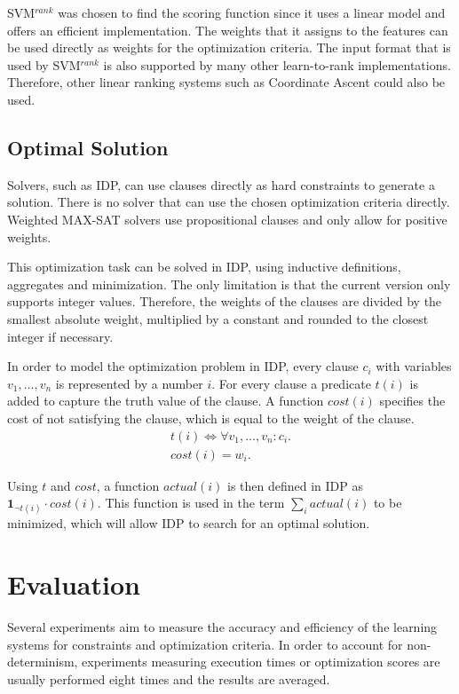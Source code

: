 \documentclass[letterpaper]{article}
\newcommand{\svm}{SVM$^{rank}$}
\theoremstyle{definition}
\begin{document}
\svm{} \cite{joachims2006training} was chosen to find the scoring function since it uses a linear model and offers an efficient implementation.
The weights that it assigns to the features can be used directly as weights for the optimization criteria.
The input format that is used by \svm{} is also supported by many other learn-to-rank implementations.
Therefore, other linear ranking systems such as Coordinate Ascent \cite{metzler2007linear} could also be used.

\subsection{Optimal Solution}
Solvers, such as IDP, can use clauses directly as hard constraints to generate a solution.
There is no solver that can use the chosen optimization criteria directly.
Weighted MAX-SAT solvers use propositional clauses and only allow for positive weights.

This optimization task can be solved in IDP, using inductive definitions, aggregates and minimization.
The only limitation is that the current version only supports integer values.
Therefore, the weights of the clauses are divided by the smallest absolute weight, multiplied by a constant and rounded to the closest integer if necessary.

In order to model the optimization problem in IDP, every clause $c_i$ with variables $v_1, ..., v_n$ is represented by a number $i$. For every clause a predicate $t(i)$ is added to capture the truth value of the clause.
A function $\mathit{cost}(i)$ specifies the cost of not satisfying the clause, which is equal to the weight of the clause.
\begin{eqnarray*}
  t(i) \Leftrightarrow \forall v_1, ..., v_n : c_i. \\
  cost(i) = w_i.
\end{eqnarray*}

Using $t$ and $\mathit{cost}$, a function $\mathit{actual}(i)$ is then defined in IDP as $\mathbf{1}_{\lnot t(i)} \cdot \mathit{cost}(i)$.
This function is used in the term $\sum_i actual(i)$ to be minimized, which will allow IDP to search for an optimal solution.


\section{Evaluation}
Several experiments aim to measure the accuracy and efficiency of the learning systems for constraints and optimization criteria.
In order to account for non-determinism, experiments measuring execution times or optimization scores are usually performed eight times and the results are averaged.
\end{document}
